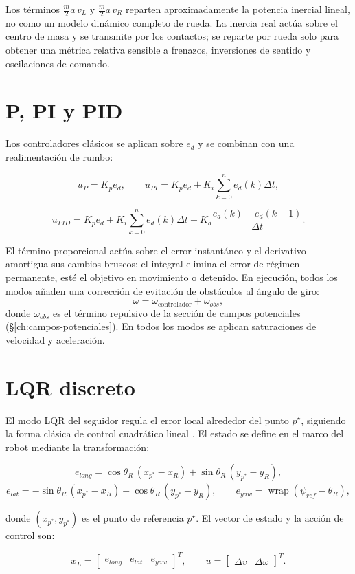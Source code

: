 Los términos \(\frac{m}{2}a\,v_L\) y
\(\frac{m}{2}a\,v_R\) reparten aproximadamente la potencia inercial lineal,
no como un modelo dinámico completo de rueda. La inercia real actúa sobre el
centro de masa y se transmite por los contactos; se reparte por rueda solo
para obtener una métrica relativa sensible a frenazos, inversiones de sentido y
oscilaciones de comando.

\section{P, PI y PID}

Los controladores clásicos se aplican sobre \(e_d\) y se combinan con una
realimentación de rumbo:

\[
u_P=K_p e_d,
\qquad
u_{PI}=K_p e_d + K_i\sum_{k=0}^{n} e_d(k)\Delta t,
\]

\[
u_{PID}=K_p e_d + K_i\sum_{k=0}^{n} e_d(k)\Delta t
+ K_d\frac{e_d(k)-e_d(k-1)}{\Delta t}.
\]

El término proporcional actúa sobre el error instantáneo y el derivativo
amortigua sus cambios bruscos; el integral elimina el error de régimen
permanente, esté el objetivo en movimiento o detenido. En ejecución, todos los modos añaden una corrección de evitación
de obstáculos al ángulo de giro:
\[
\omega = \omega_{\text{controlador}} + \omega_{obs},
\]
donde \(\omega_{obs}\) es el término repulsivo de la sección de campos potenciales
(\S\ref{ch:campos-potenciales}). En todos los modos se aplican saturaciones de velocidad y aceleración.

\section{LQR discreto}

El modo LQR del seguidor regula el error local alrededor del punto \(p^\star\),
siguiendo la forma clásica de control cuadrático lineal \cite{anderson1990}. El
estado se define en el marco del robot mediante la transformación:

\[
e_{long} = \cos\theta_R\,(x_{p^*}-x_R) + \sin\theta_R\,(y_{p^*}-y_R),
\]
\[
e_{lat}  = -\sin\theta_R\,(x_{p^*}-x_R) + \cos\theta_R\,(y_{p^*}-y_R),
\qquad
e_{yaw}  = \operatorname{wrap}(\psi_{ref}-\theta_R),
\]

donde \((x_{p^*},y_{p^*})\) es el punto de referencia \(p^\star\). El vector de
estado y la acción de control son:

\[
x_L =
\begin{bmatrix}
e_{long} & e_{lat} & e_{yaw}
\end{bmatrix}^T,
\qquad
u=
\begin{bmatrix}
\Delta v & \Delta\omega
\end{bmatrix}^T.
\]

